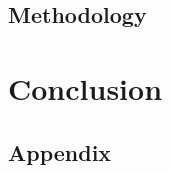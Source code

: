 \documentclass[a4paper,10pt, twoside]{report}
\begin{document}
    \section{Methodology}\label{sec:methodology}
        
    \cleardoublepage


    \chapter{Conclusion}\label{sec:conclusion}
        
    \cleardoublepage


    
    
    \cleardoublepage


    \section*{Appendix}\label{sec:appendix}
        
    \cleardoublepage
\end{document}
